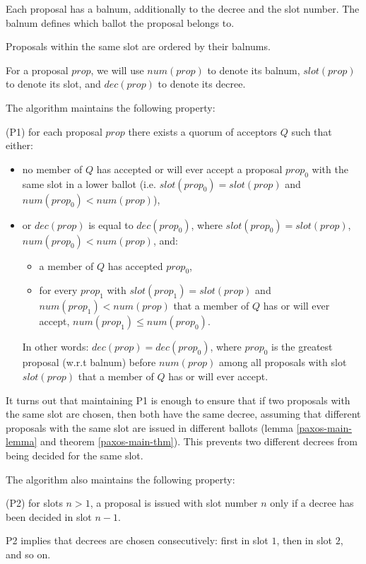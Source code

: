 \documentclass[12pt,a4paper,en]{pracamgr}
\begin{document}
Each proposal has a balnum, additionally to the decree and the slot number. The balnum defines which ballot the proposal belongs to.

Proposals within the same slot are ordered by their balnums.

For a proposal $prop$, we will use $num(prop)$ to denote its balnum, $slot(prop)$ to denote its slot, and $dec(prop)$ to denote its decree.

The algorithm maintains the following property:
\begin{center}
    (P1) for each proposal $prop$ there exists a quorum of acceptors $Q$ such that either:
    \begin{itemize}
        \item no member of $Q$ has accepted or will ever accept a proposal $prop_0$ with the same slot in a lower ballot (i.e. $slot(prop_0) = slot(prop)$ and $num(prop_0) < num(prop)$),
        \item or $dec(prop)$ is equal to $dec(prop_0)$, where $slot(prop_0) = slot(prop)$, $num(prop_0) < num(prop)$, and:
            \begin{itemize}
                \item a member of $Q$ has accepted $prop_0$,
                \item for every $prop_1$ with $slot(prop_1) = slot(prop)$ and $num(prop_1) < num(prop)$ that a member of $Q$ has or will ever accept, $num(prop_1) \le num(prop_0)$.
            \end{itemize}

            In other words: $dec(prop) = dec(prop_0)$, where $prop_0$ is the greatest proposal (w.r.t balnum) before $num(prop)$ among all proposals with slot $slot(prop)$ that a member of $Q$ has or will ever accept.
    \end{itemize}
\end{center}

It turns out that maintaining P1 is enough to ensure that if two proposals with the same slot are chosen, then both have the same decree, assuming that different proposals with the same slot are issued in different ballots (lemma \ref{paxos-main-lemma} and theorem \ref{paxos-main-thm}). This prevents two different decrees from being decided for the same slot.

The algorithm also maintains the following property:
\begin{center}(P2) for slots $n > 1$, a proposal is issued with slot number $n$ only if a decree has been decided in slot $n - 1$.\end{center}
P2 implies that decrees are chosen consecutively: first in slot $1$, then in slot $2$, and so on.
\end{document}
